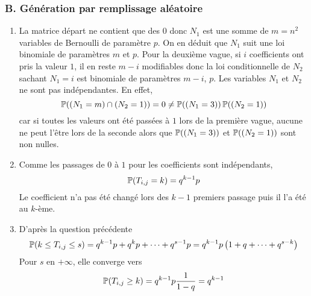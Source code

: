 \subsubsection*{B. Génération par remplissage aléatoire}
\begin{enumerate}
  \item La matrice départ ne contient que des $0$ donc $N_1$ est une somme de $m=n^2$ variables de Bernoulli de paramètre $p$. On en déduit que $N_1$ suit une loi binomiale de paramètres $m$ et $p$.\newline
Pour la deuxième vague, si $i$ coefficients ont pris la valeur $1$, il en reste $m-i$ modifiables donc la loi conditionnelle de $N_2$ sachant $N_1=i$ est binomiale de paramètres $m-i$, $p$.\newline
Les variables $N_1$ et $N_2$ ne sont pas indépendantes. En effet, 
\begin{displaymath}
\mathbb{P}( (N_1=m) \cap (N_2=1))=0  \neq \mathbb{P}((N_1=3))\,\mathbb{P}((N_2=1))
\end{displaymath}
car si toutes les valeurs ont été passées à $1$ lors de la première vague, aucune ne peut l'être lors de la seconde alors que $\mathbb{P}((N_1=3))$ et $\mathbb{P}((N_2=1))$ sont non nulles.
  \item Comme les passages de $0$ à $1$ pour les coefficients sont indépendants,
\begin{displaymath}
  \mathbb{P}(T_{i,j}=k) = q^{k-1}p
\end{displaymath}
Le coefficient n'a pas été changé lors des $k-1$ premiers passage puis il l'a été au $k$-ème.
  \item D'après la question précédente
\begin{displaymath}
\mathbb{P}(k\leq T_{i,j} \leq s) = q^{k-1}p + q^{k}p + \cdots + q^{s-1}p = q^{k-1}p\left(1+ q + \cdots + q ^{s-k} \right)    
\end{displaymath}
Pour $s$ en $+\infty$, elle converge vers
\begin{displaymath}
  \mathbb{P}(T_{i,j}\geq k) = q^{k-1}p\frac{1}{1-q} = q^{k-1}
\end{displaymath}


\end{enumerate}
